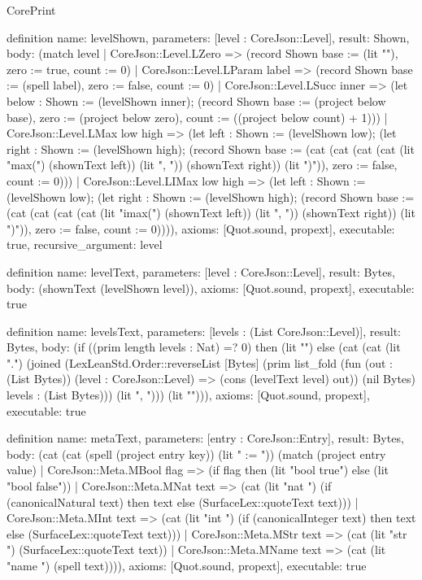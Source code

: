 \begin{lexlean}{CorePrint}
\begin{semanticmodule}
definition{
  name: levelShown,
  parameters: [level : CoreJson::Level],
  result: Shown,
  body: (match level
    | CoreJson::Level.LZero => (record Shown {base := (lit ""), zero := true, count := 0})
    | CoreJson::Level.LParam label => (record Shown {base := (spell label), zero := false, count := 0})
    | CoreJson::Level.LSucc inner => (let below : Shown := (levelShown inner); (record Shown {base := (project below base), zero := (project below zero), count := ((project below count) + 1)}))
    | CoreJson::Level.LMax low high => (let left : Shown := (levelShown low); (let right : Shown := (levelShown high); (record Shown {base := (cat (cat (cat (cat (lit "max(") (shownText left)) (lit ", ")) (shownText right)) (lit ")")), zero := false, count := 0})))
    | CoreJson::Level.LIMax low high => (let left : Shown := (levelShown low); (let right : Shown := (levelShown high); (record Shown {base := (cat (cat (cat (cat (lit "imax(") (shownText left)) (lit ", ")) (shownText right)) (lit ")")), zero := false, count := 0})))),
  axioms: [Quot.sound, propext],
  executable: true,
  recursive_argument: level
}

definition{
  name: levelText,
  parameters: [level : CoreJson::Level],
  result: Bytes,
  body: (shownText (levelShown level)),
  axioms: [Quot.sound, propext],
  executable: true
}

definition{
  name: levelsText,
  parameters: [levels : (List CoreJson::Level)],
  result: Bytes,
  body: (if ((prim length levels : Nat) =? 0) then (lit "") else (cat (cat (lit ".{") (joined (LexLeanStd.Order::reverseList [Bytes] (prim list_fold (fun (out : (List Bytes)) (level : CoreJson::Level) => (cons (levelText level) out)) (nil Bytes) levels : (List Bytes))) (lit ", "))) (lit "}"))),
  axioms: [Quot.sound, propext],
  executable: true
}

definition{
  name: metaText,
  parameters: [entry : CoreJson::Entry],
  result: Bytes,
  body: (cat (cat (spell (project entry key)) (lit " := ")) (match (project entry value)
    | CoreJson::Meta.MBool flag => (if flag then (lit "bool true") else (lit "bool false"))
    | CoreJson::Meta.MNat text => (cat (lit "nat ") (if (canonicalNatural text) then text else (SurfaceLex::quoteText text)))
    | CoreJson::Meta.MInt text => (cat (lit "int ") (if (canonicalInteger text) then text else (SurfaceLex::quoteText text)))
    | CoreJson::Meta.MStr text => (cat (lit "str ") (SurfaceLex::quoteText text))
    | CoreJson::Meta.MName text => (cat (lit "name ") (spell text)))),
  axioms: [Quot.sound, propext],
  executable: true
}


\end{semanticmodule}
\end{lexlean}

